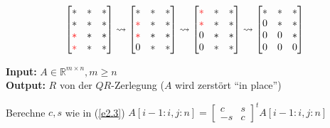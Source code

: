\documentclass{book}
\def\R{\mathbb{R}}
\begin{document}
        \[
        \begin{bmatrix}
            * & * & * \\
            * & * & * \\
            \color{red}* & * & * \\
            \color{red}* & * & * \\
        \end{bmatrix}
        \rightsquigarrow
        \begin{bmatrix}
            * & * & * \\
            \color{red}* & * & * \\
            \color{red}* & * & * \\
            0 & * & * \\
        \end{bmatrix}
        \rightsquigarrow
        \begin{bmatrix}
            \color{red}* & * & * \\
            \color{red}* & * & * \\
            0 & * & * \\
            0 & * & * \\
        \end{bmatrix}
        \rightsquigarrow
        \begin{bmatrix}
            * & * & * \\
            0 & * & * \\
            0 & 0 & * \\
            0 & 0 & 0 \\
        \end{bmatrix}
        \]

        \begin{algorithm}[H]\label{a2.13}
            \caption{}
            \textbf{Input:} $A\in\R^{m\times n},m\geq n$\\
            \textbf{Output:} $R$ von der $QR$-Zerlegung ($A$ wird zerstört ``in place'')
            \begin{algorithmic}
                    \State Berechne $c,s$ wie in (\ref{e2.3})
                    \State $A[i-1:i,j:n]=\begin{bmatrix}
                        c & s \\
                        -s & c 
                    \end{bmatrix}^t A[i-1:i,j:n]$
                \EndFor
            \EndFor
            \end{algorithmic}
        \end{algorithm}
\end{document}

